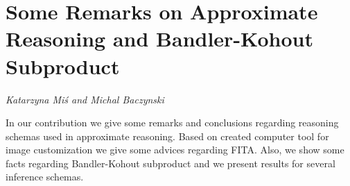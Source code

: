 \documentclass[../booklet.tex]{subfiles}
\begin{document}
\section[Some Remarks on Approximate Reasoning and Bandler-Kohout Subproduct. {\it Katarzyna Miś and Michal Baczynski}]{Some Remarks on Approximate Reasoning and Bandler-Kohout Subproduct}
 

\begin{center}
  {\it Katarzyna Miś and Michal Baczynski}
\end{center}

\vskip 0.8cm


In our contribution we give some remarks and conclusions regarding reasoning schemas used in approximate reasoning. Based on created computer tool for image customization we give some advices regarding FITA. Also, we show some facts regarding Bandler-Kohout subproduct and we present results for several inference schemas.

\end{document}
